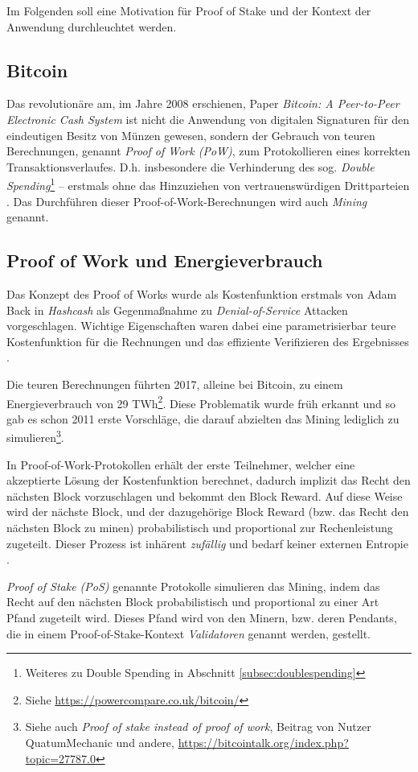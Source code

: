Im Folgenden soll eine Motivation für Proof of Stake und der Kontext der Anwendung durchleuchtet werden.

\subsection{Bitcoin}

Das revolutionäre am, im Jahre 2008 erschienen, Paper \textit{Bitcoin: A Peer-to-Peer Electronic Cash System} ist nicht die Anwendung von digitalen Signaturen für den eindeutigen Besitz von Münzen gewesen, sondern der Gebrauch von teuren Berechnungen, genannt \textit{Proof of Work (PoW)}, zum Protokollieren eines korrekten Transaktionsverlaufes. D.h. insbesondere die Verhinderung des sog. \textit{Double Spending}\footnote{Weiteres zu Double Spending in Abschnitt \ref{subsec:doublespending}} -- erstmals ohne das Hinzuziehen von vertrauenswürdigen Drittparteien \cite[S. 1, S. 8]{bitcoin}. Das Durchführen dieser Proof-of-Work-Berechnungen wird auch \textit{Mining} genannt.

\subsection{Proof of Work und Energieverbrauch}
\label{subsec:pow}

Das Konzept des Proof of Works wurde als Kostenfunktion erstmals von Adam Back in \textit{Hashcash} als Gegenmaßnahme zu \textit{Denial-of-Service} Attacken vorgeschlagen. Wichtige Eigenschaften waren dabei eine parametrisierbar teure Kostenfunktion für die Rechnungen und das effiziente Verifizieren des Ergebnisses \cite[S.1]{hashcash}.

Die teuren Berechnungen führten 2017, alleine bei Bitcoin, zu einem Energieverbrauch von 29 TWh\footnote{Siehe \url{https://powercompare.co.uk/bitcoin/}}. Diese Problematik wurde früh erkannt und so gab es schon 2011 erste Vorschläge, die darauf abzielten das Mining lediglich zu simulieren\footnote{Siehe auch \textit{Proof of stake instead of proof of work}, Beitrag von Nutzer QuatumMechanic und andere, \url{https://bitcointalk.org/index.php?topic=27787.0}}.

In Proof-of-Work-Protokollen erhält der erste Teilnehmer, welcher eine akzeptierte Lösung der Kostenfunktion berechnet, dadurch implizit das Recht den nächsten Block vorzuschlagen und bekommt den Block Reward. 
Auf diese Weise wird der nächste Block, und der dazugehörige Block Reward (bzw. das Recht den nächsten Block zu minen) probabilistisch und proportional zur Rechenleistung zugeteilt.
Dieser Prozess ist inhärent \textit{zufällig} und bedarf keiner externen Entropie \cite[S. 2f.]{ouroboros}.

\textit{Proof of Stake (PoS)} genannte Protokolle simulieren das Mining, indem das Recht auf den nächsten Block probabilistisch und proportional zu einer Art Pfand zugeteilt wird. Dieses Pfand wird von den Minern, bzw. deren Pendants, die in einem Proof-of-Stake-Kontext \textit{Validatoren} genannt werden, gestellt. 